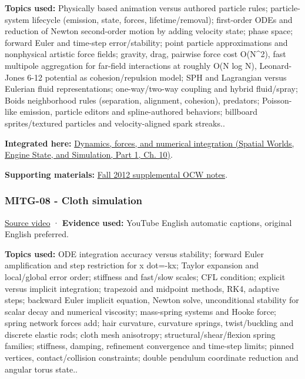 \textbf{Topics used:} Physically based animation versus authored particle rules; particle-system lifecycle (emission, state, forces, lifetime/removal); first-order ODEs and reduction of Newton second-order motion by adding velocity state; phase space; forward Euler and time-step error/stability; point particle approximations and nonphysical artistic force fields; gravity, drag, pairwise force cost O(N\^{}2), fast multipole aggregation for far-field interactions at roughly O(N log N), Leonard-Jones 6-12 potential as cohesion/repulsion model; SPH and Lagrangian versus Eulerian fluid representations; one-way/two-way coupling and hybrid fluid/spray; Boids neighborhood rules (separation, alignment, cohesion), predators; Poisson-like emission, particle editors and spline-authored behaviors; billboard sprites/textured particles and velocity-aligned spark streaks..

\textbf{Integrated here:} \href{../05-Spatial-Worlds-Engine-State-and-Simulation-P01/main.pdf\#04-visual-computing-ii-ch029-dynamics-forces-and-numerical-integration}{Dynamics, forces, and numerical integration (Spatial Worlds, Engine State, and Simulation, Part 1, Ch. 10)}.

\textbf{Supporting materials:} \href{https://ocw.mit.edu/courses/6-837-computer-graphics-fall-2012/pages/lecture-notes/}{Fall 2012 supplemental OCW notes}.

\subsubsection{MITG-08 - Cloth simulation}\label{04-visual-computing-ii-ch036-mitg-08---cloth-simulation}

\hypertarget{04-visual-computing-ii-ch036-mitg-08---cloth-simulation}{}

\href{https://www.youtube.com/watch?v=PJ8VzufNZ8o}{Source video} · \textbf{Evidence used:} YouTube English automatic captions, original English preferred.

\textbf{Topics used:} ODE integration accuracy versus stability; forward Euler amplification and step restriction for x dot=-kx; Taylor expansion and local/global error order; stiffness and fast/slow scales; CFL condition; explicit versus implicit integration; trapezoid and midpoint methods, RK4, adaptive steps; backward Euler implicit equation, Newton solve, unconditional stability for scalar decay and numerical viscosity; mass-spring systems and Hooke force; spring network forces add; hair curvature, curvature springs, twist/buckling and discrete elastic rods; cloth mesh anisotropy; structural/shear/flexion spring families; stiffness, damping, refinement convergence and time-step limits; pinned vertices, contact/collision constraints; double pendulum coordinate reduction and angular torus state..

